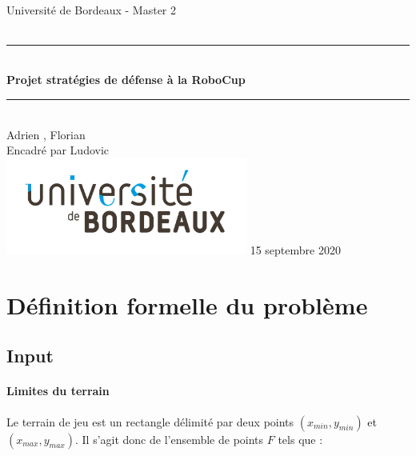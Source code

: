 \documentclass{article}
\begin{document}
\begin{titlepage}
    ~ \vfill
    \begin{center}
      \LARGE  Université de Bordeaux - Master 2\\[1.5cm]
  
      {\Large \bfseries {}}\\[0.5cm]
  
      \rule{\linewidth}{0.5mm}\\[0.4cm] {\Huge \bfseries Projet stratégies de défense à la RoboCup \\[0.2cm]} \rule{\linewidth}{0.5mm}\\[1.5cm] {
      \Large Adrien , Florian }\\[0.5cm]
  
                {\large Encadré par Ludovic }\\ \vfill
                \includegraphics[width = 300px]{logo.jpg} \vfill
                                {\large 15 septembre 2020}
    \end{center}
\end{titlepage}

\section{Définition formelle du problème}


\subsection{Input}

\paragraph{Limites du terrain} Le terrain de jeu est un rectangle délimité par deux points $(x_{min}, y_{min})$ et $(x_{max}, y_{max})$. Il s'agit donc de l'ensemble de points $F$ tels que :
\end{document}
